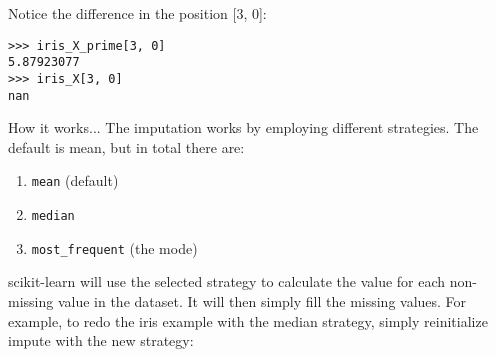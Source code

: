 \documentclass[SKL-MASTER.tex]{subfiles}
\begin{document}
Notice the difference in the position [3, 0]:
\begin{framed}
	\begin{verbatim}
>>> iris_X_prime[3, 0]
5.87923077
>>> iris_X[3, 0]
nan
\end{verbatim}
\end{framed}
How it works...
The imputation works by employing different strategies. The default is mean, but in total
there are:
\begin{enumerate}
\item \texttt{mean} (default)
\item \texttt{median}
\item \texttt{most\_frequent} (the mode)
\end{enumerate}

scikit-learn will use the selected strategy to calculate the value for each non-missing value in
the dataset. It will then simply fill the missing values.
For example, to redo the iris example with the median strategy, simply reinitialize impute
with the new strategy:
\end{document}
